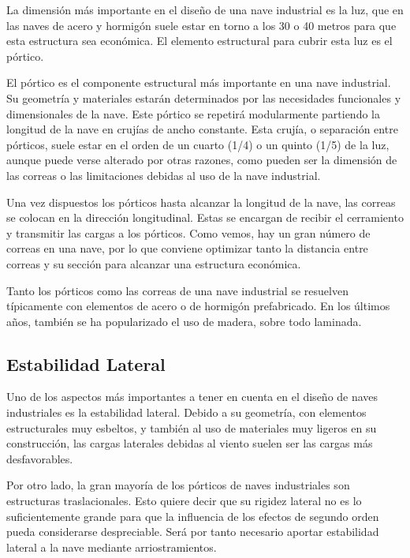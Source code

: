 La dimensión más importante en el diseño de una nave industrial es la luz, que en las naves de acero y hormigón suele estar en torno a los 30 o 40 metros para que esta estructura sea económica. El elemento estructural para cubrir esta luz es el pórtico.

El pórtico es el componente estructural más importante en una nave industrial. Su geometría y materiales estarán determinados por las necesidades funcionales y dimensionales de la nave. Este pórtico se repetirá modularmente partiendo la longitud de la nave en crujías de ancho constante. Esta crujía, o separación entre pórticos, suele estar en el orden de un cuarto (1/4) o un quinto (1/5) de la luz, aunque puede verse alterado por otras razones, como pueden ser la dimensión de las correas o las limitaciones debidas al uso de la nave industrial.

Una vez dispuestos los pórticos hasta alcanzar la longitud de la nave, las correas se colocan en la dirección longitudinal. Estas se encargan de recibir el cerramiento y transmitir las cargas a los pórticos. Como vemos, hay un gran número de correas en una nave, por lo que conviene optimizar tanto la distancia entre correas y su sección para alcanzar una estructura económica.

Tanto los pórticos como las correas de una nave industrial se resuelven típicamente con elementos de acero o de hormigón prefabricado. En los últimos años, también se ha popularizado el uso de madera, sobre todo laminada.

\subsection{Estabilidad Lateral}

Uno de los aspectos más importantes a tener en cuenta en el diseño de naves industriales es la estabilidad lateral. Debido a su geometría, con elementos estructurales muy esbeltos, y también al uso de materiales muy ligeros en su construcción, las cargas laterales debidas al viento suelen ser las cargas más desfavorables.

Por otro lado, la gran mayoría de los pórticos de naves industriales son estructuras traslacionales. Esto quiere decir que su rigidez lateral no es lo suficientemente grande para que la influencia de los efectos de segundo orden pueda considerarse despreciable. Será por tanto necesario aportar estabilidad lateral a la nave mediante arriostramientos.

